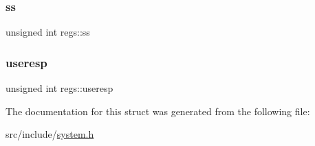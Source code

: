 \mbox{\label{structregs_ae24c40e9efb433989445bfd318564c90}} 
\subsubsection{\texorpdfstring{ss}{ss}}
{\footnotesize\ttfamily unsigned int regs\+::ss}

\mbox{\label{structregs_a55d3b6b0025dd401f204d585d256c140}} 
\subsubsection{\texorpdfstring{useresp}{useresp}}
{\footnotesize\ttfamily unsigned int regs\+::useresp}



The documentation for this struct was generated from the following file\+:\begin{DoxyCompactItemize}
\item 
src/include/\hyperlink{system_8h}{system.\+h}\end{DoxyCompactItemize}
